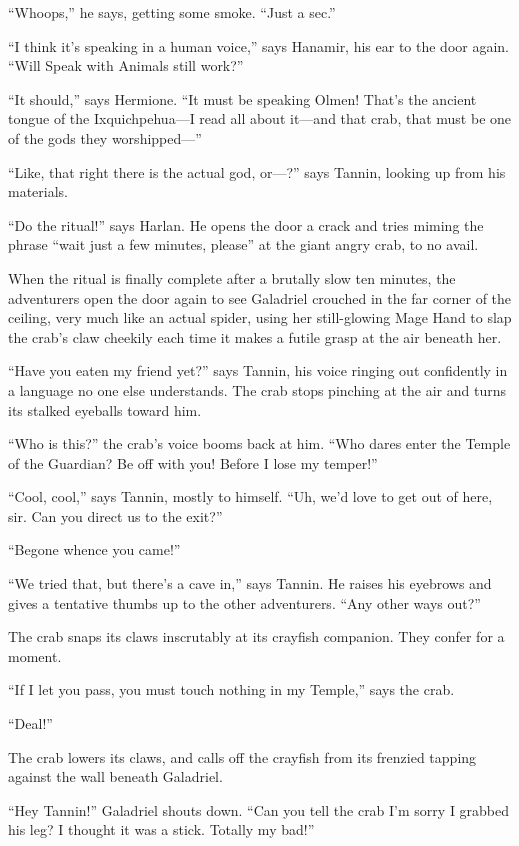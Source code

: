 \documentclass[smalldemyvopaper,11pt,twoside,onecolumn,openright,extrafontsizes]{memoir}
\begin{document}
``Whoops,'' he says, getting some smoke. ``Just a sec.''

``I think it's speaking in a human voice,'' says Hanamir, his ear to the
door again. ``Will Speak with Animals still work?''

``It should,'' says Hermione. ``It must be speaking Olmen! That's the
ancient tongue of the Ixquichpehua---I read all about it---and that
crab, that must be one of the gods they worshipped---''

``Like, that right there is the actual god, or---?'' says Tannin,
looking up from his materials.

``Do the ritual!'' says Harlan. He opens the door a crack and tries
miming the phrase ``wait just a few minutes, please'' at the giant angry
crab, to no avail.

When the ritual is finally complete after a brutally slow ten minutes,
the adventurers open the door again to see Galadriel crouched in the far
corner of the ceiling, very much like an actual spider, using her
still-glowing Mage Hand to slap the crab's claw cheekily each time it
makes a futile grasp at the air beneath her.

``Have you eaten my friend yet?'' says Tannin, his voice ringing out
confidently in a language no one else understands. The crab stops
pinching at the air and turns its stalked eyeballs toward him.

``Who is this?'' the crab's voice booms back at him. ``Who dares enter
the Temple of the Guardian? Be off with you! Before I lose my temper!''

``Cool, cool,'' says Tannin, mostly to himself. ``Uh, we'd love to get
out of here, sir. Can you direct us to the exit?''

``Begone whence you came!''

``We tried that, but there's a cave in,'' says Tannin. He raises his
eyebrows and gives a tentative thumbs up to the other adventurers. ``Any
other ways out?''

The crab snaps its claws inscrutably at its crayfish companion. They
confer for a moment.

``If I let you pass, you must touch nothing in my Temple,'' says the
crab.

``Deal!''

The crab lowers its claws, and calls off the crayfish from its frenzied
tapping against the wall beneath Galadriel.

``Hey Tannin!'' Galadriel shouts down. ``Can you tell the crab I'm sorry
I grabbed his leg? I thought it was a stick. Totally my bad!''
\end{document}
